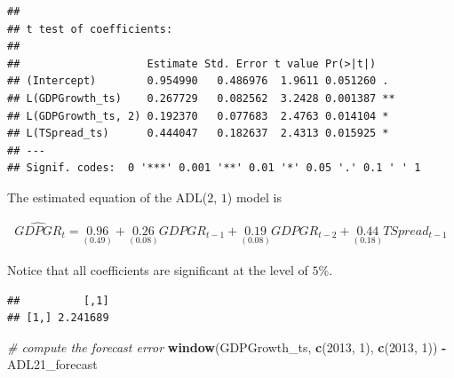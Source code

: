 \documentclass[]{book}
\newenvironment{Shaded}{\begin{snugshade}}{\end{snugshade}}
\newcommand{\KeywordTok}[1]{\textcolor[rgb]{0.13,0.29,0.53}{\textbf{#1}}}
\newcommand{\DecValTok}[1]{\textcolor[rgb]{0.00,0.00,0.81}{#1}}
\newcommand{\StringTok}[1]{\textcolor[rgb]{0.31,0.60,0.02}{#1}}
\newcommand{\CommentTok}[1]{\textcolor[rgb]{0.56,0.35,0.01}{\textit{#1}}}
\newcommand{\OperatorTok}[1]{\textcolor[rgb]{0.81,0.36,0.00}{\textbf{#1}}}
\newcommand{\NormalTok}[1]{#1}
\theoremstyle{definition}
\theoremstyle{definition}
\theoremstyle{definition}
\theoremstyle{remark}
\begin{document}
\begin{verbatim}
## 
## t test of coefficients:
## 
##                    Estimate Std. Error t value Pr(>|t|)   
## (Intercept)        0.954990   0.486976  1.9611 0.051260 . 
## L(GDPGrowth_ts)    0.267729   0.082562  3.2428 0.001387 **
## L(GDPGrowth_ts, 2) 0.192370   0.077683  2.4763 0.014104 * 
## L(TSpread_ts)      0.444047   0.182637  2.4313 0.015925 * 
## ---
## Signif. codes:  0 '***' 0.001 '**' 0.01 '*' 0.05 '.' 0.1 ' ' 1
\end{verbatim}

The estimated equation of the ADL(\(2\), \(1\)) model is

\begin{align}
  \widehat{GDPGR}_t = \underset{(0.49)}{0.96} + \underset{(0.08)}{0.26} GDPGR_{t-1} + \underset{(0.08)}{0.19} GDPGR_{t-2} + \underset{(0.18)}{0.44} TSpread_{t-1} \label{eq:gdpgradl21}
\end{align}

Notice that all coefficients are significant at the level of \(5\%\).

\begin{Shaded}
\end{Shaded}

\begin{verbatim}
##          [,1]
## [1,] 2.241689
\end{verbatim}

\begin{Shaded}
\begin{Highlighting}[]
\CommentTok{# compute the forecast error}
\KeywordTok{window}\NormalTok{(GDPGrowth_ts, }\KeywordTok{c}\NormalTok{(}\DecValTok{2013}\NormalTok{, }\DecValTok{1}\NormalTok{), }\KeywordTok{c}\NormalTok{(}\DecValTok{2013}\NormalTok{, }\DecValTok{1}\NormalTok{)) }\OperatorTok{-}\StringTok{ }\NormalTok{ADL21_forecast}
\end{Highlighting}
\end{Shaded}
\end{document}
